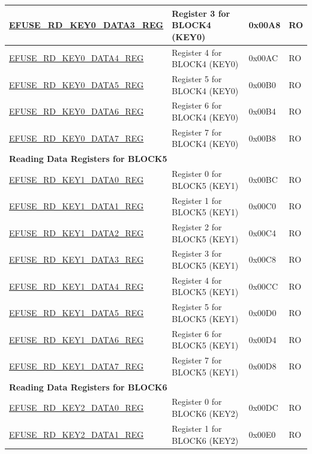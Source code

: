 \begin{longtable}{ | p{7.2cm} | p{6cm} | p{1.3cm} | p{1cm} | }
\hyperref[regdesc:EFUSERDKEY0DATANREG]{EFUSE\_RD\_KEY0\_DATA3\_REG} & Register 3 for BLOCK4 (KEY0) & 0x00A8 & RO \\ \hline
\hyperref[regdesc:EFUSERDKEY0DATANREG]{EFUSE\_RD\_KEY0\_DATA4\_REG} & Register 4 for BLOCK4 (KEY0) & 0x00AC & RO \\ \hline
\hyperref[regdesc:EFUSERDKEY0DATANREG]{EFUSE\_RD\_KEY0\_DATA5\_REG} & Register 5 for BLOCK4 (KEY0) & 0x00B0 & RO \\ \hline
\hyperref[regdesc:EFUSERDKEY0DATANREG]{EFUSE\_RD\_KEY0\_DATA6\_REG} & Register 6 for BLOCK4 (KEY0) & 0x00B4 & RO \\ \hline
\hyperref[regdesc:EFUSERDKEY0DATANREG]{EFUSE\_RD\_KEY0\_DATA7\_REG} & Register 7 for BLOCK4 (KEY0) & 0x00B8 & RO \\ \hline
\multicolumn{4}{|l|}{\textbf{Reading Data Registers for BLOCK5}} \\ \hline
\hyperref[regdesc:EFUSERDKEY1DATANREG]{EFUSE\_RD\_KEY1\_DATA0\_REG} & Register 0 for BLOCK5 (KEY1) & 0x00BC & RO \\ \hline
\hyperref[regdesc:EFUSERDKEY1DATANREG]{EFUSE\_RD\_KEY1\_DATA1\_REG} & Register 1 for BLOCK5 (KEY1) & 0x00C0 & RO \\ \hline
\hyperref[regdesc:EFUSERDKEY1DATANREG]{EFUSE\_RD\_KEY1\_DATA2\_REG} & Register 2 for BLOCK5 (KEY1) & 0x00C4 & RO \\ \hline
\hyperref[regdesc:EFUSERDKEY1DATANREG]{EFUSE\_RD\_KEY1\_DATA3\_REG} & Register 3 for BLOCK5 (KEY1) & 0x00C8 & RO \\ \hline
\hyperref[regdesc:EFUSERDKEY1DATANREG]{EFUSE\_RD\_KEY1\_DATA4\_REG} & Register 4 for BLOCK5 (KEY1) & 0x00CC & RO \\ \hline
\hyperref[regdesc:EFUSERDKEY1DATANREG]{EFUSE\_RD\_KEY1\_DATA5\_REG} & Register 5 for BLOCK5 (KEY1) & 0x00D0 & RO \\ \hline
\hyperref[regdesc:EFUSERDKEY1DATANREG]{EFUSE\_RD\_KEY1\_DATA6\_REG} & Register 6 for BLOCK5 (KEY1) & 0x00D4 & RO \\ \hline
\hyperref[regdesc:EFUSERDKEY1DATANREG]{EFUSE\_RD\_KEY1\_DATA7\_REG} & Register 7 for BLOCK5 (KEY1) & 0x00D8 & RO \\ \hline
\multicolumn{4}{|l|}{\textbf{Reading Data Registers for BLOCK6}} \\ \hline
\hyperref[regdesc:EFUSERDKEY2DATANREG]{EFUSE\_RD\_KEY2\_DATA0\_REG} & Register 0 for BLOCK6 (KEY2) & 0x00DC & RO \\ \hline
\hyperref[regdesc:EFUSERDKEY2DATANREG]{EFUSE\_RD\_KEY2\_DATA1\_REG} & Register 1 for BLOCK6 (KEY2) & 0x00E0 & RO \\ \hline

\end{longtable}
